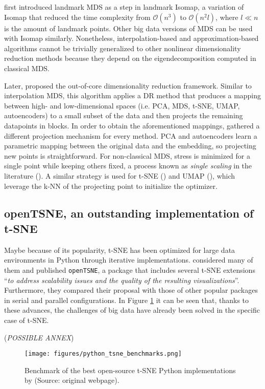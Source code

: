 \citet{Silva2002} first introduced landmark MDS as a step in landmark Isomap, a variation of Isomap that reduced the time complexity from $\mathcal{O}(n^3)$ to $\mathcal{O}(n^2l)$, where $l \ll n$ is the amount of landmark points. Other big data versions of MDS can be used with Isomap similarly. Nonetheless, interpolation-based and approximation-based algorithms cannot be trivially generalized to other nonlinear dimensionality reduction methods because they depend on the eigendecomposition computed in classical MDS.

Later, \citet{Reichmann2024} proposed the out-of-core dimensionality reduction framework. Similar to interpolation MDS, this algorithm applies a DR method that produces a mapping between high- and low-dimensional spaces (i.e. PCA, MDS, t-SNE, UMAP, autoencoders) to a small subset of the data and then projects the remaining datapoints in blocks. In order to obtain the aforementioned mappings, \citet{Reichmann2024} gathered a different projection mechanism for every method. PCA and autoencoders learn a parametric mapping between the original data and the embedding, so projecting new points is straightforward. For non-classical MDS, stress is minimized for a single point while keeping others fixed, a process known as \textit{single scaling} in the literature (\cite{Basalaj1999}). A similar strategy is used for t-SNE (\cite{Zhang2021}) and UMAP (\cite{McInnes2018a}), which leverage the k-NN of the projecting point to initialize the optimizer.

\subsection{openTSNE, an outstanding implementation of t-SNE}
\label{sec:openTSNE}

Maybe because of its popularity, t-SNE has been optimized for large data environments in Python through iterative implementations. \citet{Policar2024} considered many of them and published \verb|openTSNE|, a package that includes several t-SNE extensions \enquote{\textit{to address scalability issues and the quality of the resulting visualizations}}. Furthermore, they compared their proposal with those of other popular packages in serial and parallel configurations. In Figure \ref{fig:python_tsne_benchmarks} it can be seen that, thanks to these advances, the challenges of big data have already been solved in the specific case of t-SNE.

(\textit{POSSIBLE ANNEX})

\begin{figure}
    \centering
    \texttt{[image: figures/python\_tsne\_benchmarks.png]}
    \caption{Benchmark of the best open-source t-SNE Python implementations by \cite{Poličar2023} (Source: original webpage).}
    \label{fig:python_tsne_benchmarks}
\end{figure}